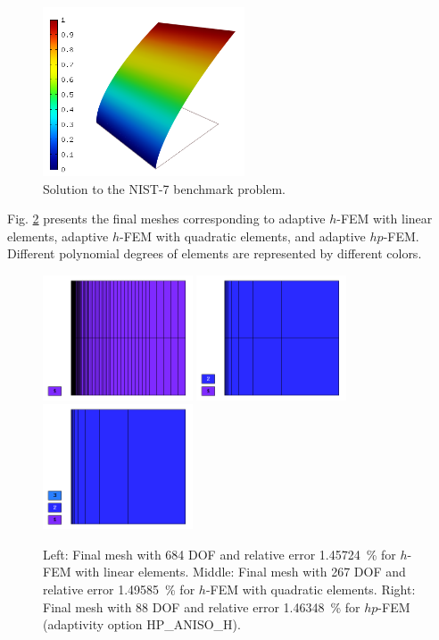 \documentclass[12pt]{elsarticle}
\begin{document}
\begin{figure}[H]
\centering
\includegraphics[height=5cm]{nist/nist-7/solution.png}
\vspace{-3mm}
\caption{Solution to the NIST-7 benchmark problem.}
\label{fig:sln-nist07}
\end{figure}

Fig. \ref{fig:nist-7-hp-aniso} presents the final meshes corresponding to adaptive $h$-FEM with 
linear elements, adaptive $h$-FEM with quadratic elements, and adaptive $hp$-FEM. Different 
polynomial degrees of elements are represented by different colors. 

\begin{figure}[H]
\centering
\vspace{-5mm}
\includegraphics[height=3.7cm]{nist/nist-7/mesh_h1_aniso.png}
\includegraphics[height=3.7cm]{nist/nist-7/mesh_h2_aniso.png}
\includegraphics[height=3.7cm]{nist/nist-7/mesh_hp_aniso.png}
\vspace{-3mm}
\caption{
Left: Final mesh with 684 DOF and relative error 1.45724~\% for $h$-FEM with linear elements.
Middle: Final mesh with 267 DOF and relative error 1.49585~\% for $h$-FEM with quadratic elements. 
Right: Final mesh with 88 DOF and relative error 1.46348~\% for $hp$-FEM (adaptivity option HP\_ANISO\_H).}
\vspace{-3mm}
\label{fig:nist-7-hp-aniso}
\end{figure}
\end{document}
